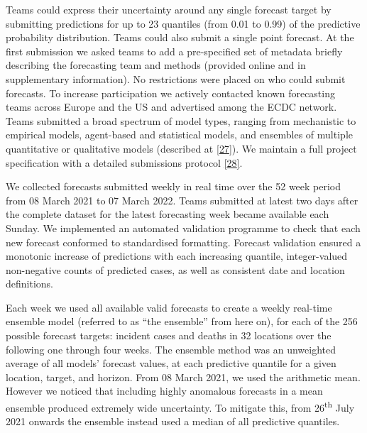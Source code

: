 \documentclass[
]{article}
\begin{document}
Teams could express their uncertainty around any single forecast target by submitting predictions for up to 23 quantiles (from 0.01 to 0.99) of the predictive probability distribution. Teams could also submit a single point forecast. At the first submission we asked teams to add a pre-specified set of metadata briefly describing the forecasting team and methods (provided online and in supplementary information). No restrictions were placed on who could submit forecasts. To increase participation we actively contacted known forecasting teams across Europe and the US and advertised among the ECDC network. Teams submitted a broad spectrum of model types, ranging from mechanistic to empirical models, agent-based and statistical models, and ensembles of multiple quantitative or qualitative models (described at \protect\hyperlink{ref-europeancovid-19forecasthubCommunity}{{[}27{]}}). We maintain a full project specification with a detailed submissions protocol \protect\hyperlink{ref-europeancovid-19forecasthubCovid19forecasthubeuropeWiki}{{[}28{]}}.

We collected forecasts submitted weekly in real time over the 52 week period from 08 March 2021 to 07 March 2022. Teams submitted at latest two days after the complete dataset for the latest forecasting week became available each Sunday. We implemented an automated validation programme to check that each new forecast conformed to standardised formatting. Forecast validation ensured a monotonic increase of predictions with each increasing quantile, integer-valued non-negative counts of predicted cases, as well as consistent date and location definitions.

Each week we used all available valid forecasts to create a weekly real-time ensemble model (referred to as ``the ensemble'' from here on), for each of the 256 possible forecast targets: incident cases and deaths in 32 locations over the following one through four weeks. The ensemble method was an unweighted average of all models' forecast values, at each predictive quantile for a given location, target, and horizon. From 08 March 2021, we used the arithmetic mean. However we noticed that including highly anomalous forecasts in a mean ensemble produced extremely wide uncertainty. To mitigate this, from 26\textsuperscript{th} July 2021 onwards the ensemble instead used a median of all predictive quantiles.
\end{document}
